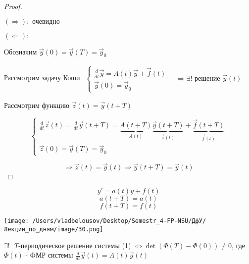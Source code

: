 \documentclass[12pt, a4paper]{report}
\begin{document}
\begin{proof} \(  \) 
    \begin{flushleft}
         \((\Rightarrow ): \text{ очевидно }  \)
    \end{flushleft}  

    \begin{flushleft}
        \( (\Leftarrow):  \) 
    \end{flushleft}

    Обозначим \( \vec{y } (0 )= \vec{y } (T )= \vec{y}  _0  \) 

    Рассмотрим задачу Коши \( \begin{aligned}
        \displaystyle \begin{cases}
            \displaystyle  \frac{d}{dt }  \vec{y }  = A(t ) \vec{y } + \vec{f }  (t)\\
            \vec{y } (0) = \vec{y } _0
            \end{cases}
            \quad \Rightarrow \exists  ! \text{ решение } \vec{y} (t ) 
    \end{aligned} \) 

    Рассмотрим функцию \( \vec{z } (t    ) = \vec{y } (t+T ) \) 

    \[ \begin{cases}
        \frac{d}{dt } \vec{z }  (t ) = \frac{d}{dt }  \vec{y }  (t +T) = \underbrace{A (t + T )}_{A(t )} \underbrace{\vec{y } (t+T )}_{\vec{z } (t )} +\underbrace{\vec{f }  (t + T )}_{\vec{f } (t )} \\
        \vec{z } (0) = \vec{y } (T ) = \vec{y } _0 
    \end{cases}\]  

\[     \Rightarrow \vec{z } (t ) = \vec{y } (t ) \Rightarrow \vec{y } (t+T ) = \vec{y } (t)\] 
\end{proof}

\[ y ' = a(t ) y + f(t )\] 
\[ a(t +T ) = a(t ) \]  
\[ f(t+T ) = f(t )\]  

\begin{center}
    \texttt{[image: /Users/vladbelousov/Desktop/Semestr\_4-FP-NSU/ДфУ/Лекции\_по\_дням/image/30.png]}
\end{center}

\begin{theorem}
    \( \exists !    \text{ }  T\)-периодическое решение системы (1) \( \Leftrightarrow  \det (\Phi (T ) - \Phi (0)) \neq 0  \), где \( \Phi(t) \) - ФМР системы \( \displaystyle  \frac{d}{dt } \vec{y } (t )= A(t )\vec{y} (t) \) 
\end{theorem}
\end{document}
